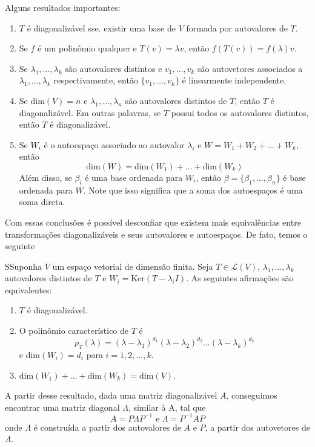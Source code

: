 \documentclass[12pt,a4paper]{article}
\begin{document}
Alguns resultados importantes:

\begin{enumerate}
\item $T$ é diagonalizável sse. existir uma base de $V$ formada por autovalores de $T$.
\item Se $f$ é um polinômio qualquer e $T(v)=\lambda v$, então $f(T(v)) = f(\lambda)v$.
\item Se $\lambda_1, \ldots, \lambda_k$ são autovalores distintos e $v_1, \ldots, v_k$ são autovetores associados a $\lambda_1, \ldots, \lambda_k$ respectivamente, então $\{ v_1, \ldots, v_k \}$ é linearmente independente.
\item Se $\text{dim}(V)=n$ e $\lambda_1, \ldots, \lambda_n$ são autovalores distintos de $T$, então $T$ é diagonalizável. Em outras palavras, se $T$ possui todos os autovalores distintos, então $T$ é diagonalizável.
\item Se $W_i$ é o autoespaço associado ao autovalor $\lambda_i$ e $W = W_1 + W_2 + \ldots + W_k$, então \[ \text{dim} (W) = \text{dim} (W_1) + \ldots + \text{dim} (W_k) \] Além disso, se $\beta_i$ é uma base ordenada para $W_i$, então $\beta = \{ \beta_1, \ldots, \beta_n \}$ é base ordenada para $W$. Note que isso significa que a soma dos autoespaços é uma soma direta.
\end{enumerate}

Com essas conclusões é possível desconfiar que existem mais equivalências entre transformações diagonalizáveis e seus autovalores e autoespaços. De fato, temos o seguinte

\begin{teorema}{}
  SSuponha $V$ um espaço vetorial de dimensão finita. Seja $T \in \mathcal{L}(V)$, $\lambda_1, \ldots, \lambda_k$ autovalores distintos de $T$ e $W_i = \text{Ker}(T - \lambda_i I)$. As seguintes afirmações são equivalentes:
\begin{enumerate}
\item $T$ é diagonalizável.
\item O polinômio característico de $T$ é \[ p_T(\lambda) = (\lambda - \lambda_1)^{d_1} (\lambda - \lambda_2)^{d_2} \ldots (\lambda - \lambda_k)^{d_k} \] e $\text{dim}(W_i) = d_i$ para $i = 1, 2, \ldots, k$.
\item $\text{dim}(W_1) + \ldots + \text{dim}(W_k) = \text{dim}(V)$.
\end{enumerate}
\end{teorema}

A partir desse resultado, dada uma matriz diagonalizável $A$, conseguimos encontrar uma matriz diagonal $\Lambda$, similar à A, tal que
\[
A = P \Lambda P^{-1} \text{ e } \Lambda = P^{-1} A P
\]
onde $\Lambda$ é construída a partir dos autovalores de $A$ e $P$, a partir dos autovetores de $A$.
\end{document}
